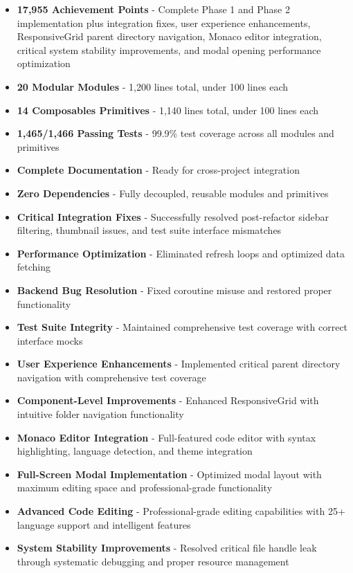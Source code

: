 \documentclass[11pt]{article}
\begin{document}
\begin{itemize}
\item \textbf{17,955 Achievement Points} - Complete Phase 1 and Phase 2 implementation plus integration fixes, user experience enhancements, ResponsiveGrid parent directory navigation, Monaco editor integration, critical system stability improvements, and modal opening performance optimization
\item \textbf{20 Modular Modules} - 1,200 lines total, under 100 lines each
\item \textbf{14 Composables Primitives} - 1,140 lines total, under 100 lines each
\item \textbf{1,465/1,466 Passing Tests} - 99.9\% test coverage across all modules and primitives
\item \textbf{Complete Documentation} - Ready for cross-project integration
\item \textbf{Zero Dependencies} - Fully decoupled, reusable modules and primitives
\item \textbf{Critical Integration Fixes} - Successfully resolved post-refactor sidebar filtering, thumbnail issues, and test suite interface mismatches
\item \textbf{Performance Optimization} - Eliminated refresh loops and optimized data fetching
\item \textbf{Backend Bug Resolution} - Fixed coroutine misuse and restored proper functionality
\item \textbf{Test Suite Integrity} - Maintained comprehensive test coverage with correct interface mocks
\item \textbf{User Experience Enhancements} - Implemented critical parent directory navigation with comprehensive test coverage
\item \textbf{Component-Level Improvements} - Enhanced ResponsiveGrid with intuitive folder navigation functionality
\item \textbf{Monaco Editor Integration} - Full-featured code editor with syntax highlighting, language detection, and theme integration
\item \textbf{Full-Screen Modal Implementation} - Optimized modal layout with maximum editing space and professional-grade functionality
\item \textbf{Advanced Code Editing} - Professional-grade editing capabilities with 25+ language support and intelligent features
\item \textbf{System Stability Improvements} - Resolved critical file handle leak through systematic debugging and proper resource management

\end{itemize}
\end{document}
